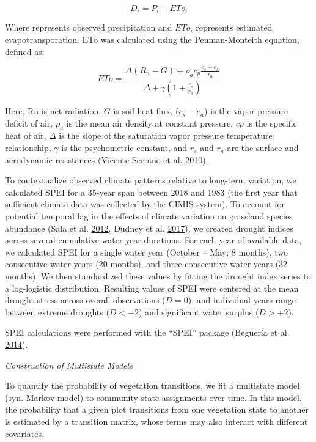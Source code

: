 \documentclass[twoside,12pt,final]{ucthesis-CA2012}
\begin{document}
\begin{ucmainmatter}
\[
D_i = P_i - ETo_i
\]

Where represents observed precipitation and \(ETo_i\) represents estimated evapotransporation. ETo was calculated using the Penman-Monteith equation, defined as:

\[
ETo = \frac{\Delta(R_n - G) + \rho_a c_p \frac{e_s - e_a}{r_a}}{\Delta + \gamma(1 + \frac{r_s}{r_a})}
\]

Here, Rn is net radiation, \(G\) is soil heat flux, (\(e_s - e_a\)) is the vapor pressure deficit of air, \(\rho_a\) is the mean air density at constant pressure, \(cp\) is the specific heat of air, \(\Delta\) is the slope of the saturation vapor pressure temperature relationship, \(\gamma\) is the psychometric constant, and \(r_s\) and \(r_a\) are the surface and aerodynamic resistances (Vicente-Serrano et al. \protect\hyperlink{ref-Vicente-Serrano2010}{2010}).

To contextualize observed climate patterns relative to long-term variation, we calculated SPEI for a 35-year span between 2018 and 1983 (the first year that sufficient climate data was collected by the CIMIS system).
To account for potential temporal lag in the effects of climate variation on grassland species abundance (Sala et al. \protect\hyperlink{ref-Sala2012b}{2012}, Dudney et al. \protect\hyperlink{ref-Dudney2017}{2017}), we created drought indices across several cumulative water year durations.
For each year of available data, we calculated SPEI for a single water year (October -- May; 8 months), two consecutive water years (20 months), and three consecutive water years (32 months).
We then standardized these values by fitting the drought index series to a log-logistic distribution.
Resulting values of SPEI were centered at the mean drought stress across overall observations (\(D = 0\)), and individual years range between extreme droughts (\(D < -2\)) and significant water surplus (\(D > +2\)).

SPEI calculations were performed with the ``SPEI'' package (Beguería et al. \protect\hyperlink{ref-Begueria2014}{2014}).

\emph{Construction of Multistate Models}

To quantify the probability of vegetation transitions, we fit a multistate model (syn. Markov model) to community state assignments over time.
In this model, the probability that a given plot transitions from one vegetation state to another is estimated by a transition matrix, whose terms may also interact with different covariates.


\end{ucmainmatter}
\end{document}

